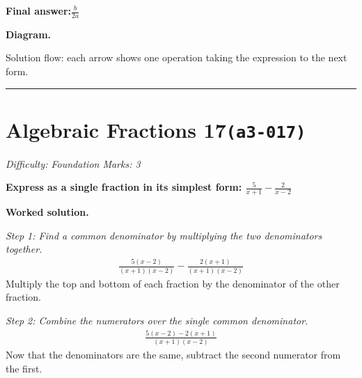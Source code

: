 \documentclass[11pt]{article}
\newcommand{\question}[1]{\par\medskip\noindent\textbf{#1}\par}
\begin{document}
\begin{answerbox}
\textbf{Final answer:}\quad \(\displaystyle \frac{b}{2a}\)
\end{answerbox}
\textbf{Diagram.}

\begin{center}
\end{center}
\small Solution flow: each arrow shows one operation taking the expression to the next form.\normalsize

\medskip\hrule

\section*{Algebraic Fractions 17\quad\small\texttt{(a3-017)}}
\textit{Difficulty: Foundation \quad\textbar\quad Marks: 3}

\question{Express as a single fraction in its simplest form: \( \frac{5}{x+1} - \frac{2}{x-2} \)}

\textbf{Worked solution.}

\textit{Step 1: Find a common denominator by multiplying the two denominators together.}
\[\begin{gathered}
\frac{5(x-2)}{(x+1)(x-2)} - \frac{2(x+1)}{(x+1)(x-2)}
\end{gathered}\]
Multiply the top and bottom of each fraction by the denominator of the other fraction.

\textit{Step 2: Combine the numerators over the single common denominator.}
\[\begin{gathered}
\frac{5(x-2) - 2(x+1)}{(x+1)(x-2)}
\end{gathered}\]
Now that the denominators are the same, subtract the second numerator from the first.
\end{document}
